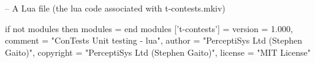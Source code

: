 
\startchapter[title=Preamble]

\startMkIVCode



%
%


\usemodule[t-contests]

\unprotect


\stopMkIVCode

\startLuaCode

-- A Lua file (the lua code associated with t-contests.mkiv)

if not modules then modules = { } end modules ['t-contests'] = {
    version   = 1.000,
    comment   = "ConTests Unit testing - lua",
    author    = "PerceptiSys Ltd (Stephen Gaito)",
    copyright = "PerceptiSys Ltd (Stephen Gaito)",
    license   = "MIT License"
}


